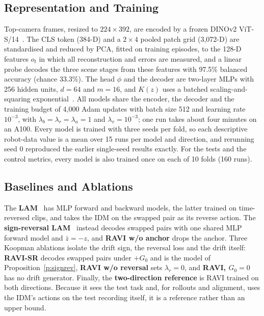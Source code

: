 \documentclass{jcse}
\newcommand{\method}{RAVI}
\newcommand{\zb}{\bar{z}}
\begin{document}
\subsection{Representation and Training}
Top-camera frames, resized to $224\times392$, are encoded by a frozen DINOv2 ViT-S/14~\cite{oquab2024dinov2}. The CLS token (384-D) and a $2\times4$ pooled patch grid (3,072-D) are standardised and reduced by PCA, fitted on training episodes, to the 128-D features $o_t$ in which all reconstruction and errors are measured, and a linear probe decodes the three scene stages from these features with 97.5\% balanced accuracy (chance 33.3\%).
The head $\phi$ and the decoder are two-layer MLPs with 256 hidden units, $d=64$ and $m=16$, and $K(z)$ uses a batched scaling-and-squaring exponential~\cite{higham2005scaling}.
All models share the encoder, the decoder and the training budget of 4,000 Adam updates with batch size 512 and learning rate $10^{-3}$, with $\lambda_b=\lambda_r=\lambda_a=1$ and $\lambda_v=10^{-3}$; one run takes about four minutes on an A100.
Every model is trained with three seeds per fold, so each descriptive robot-data value is a mean over 15 runs per model and direction, and rerunning seed 0 reproduced the earlier single-seed results exactly. For the tests and the control metrics, every model is also trained once on each of 10 folds (160 runs).

\subsection{Baselines and Ablations}
The \textbf{LAM}~\cite{schmidt2024lapo} has MLP forward and backward models, the latter trained on time-reversed clips, and takes the IDM on the swapped pair as its reverse action.
The \textbf{sign-reversal LAM}~\cite{tang2026alam} instead decodes swapped pairs with one shared MLP forward model and $\zb=-z$, and \textbf{{\method} w/o anchor} drops the anchor.
Three Koopman ablations isolate the drift sign, the reversal loss and the drift itself: \textbf{{\method}-SR} decodes swapped pairs under $+G_0$ and is the model of Proposition~\ref{p:signrev}, \textbf{{\method} w/o reversal} sets $\lambda_r=0$, and \textbf{{\method}, $G_0=0$} has no drift generator.
Finally, the \textbf{two-direction reference} is {\method} trained on both directions. Because it sees the test task and, for rollouts and alignment, uses the IDM's actions on the test recording itself, it is a reference rather than an upper bound.
\end{document}
